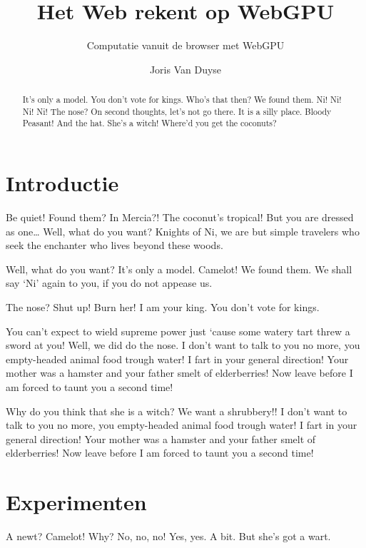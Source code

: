 \documentclass[a0,portrait]{hogent-poster}
\title{Het Web rekent op WebGPU}
\subtitle{Computatie vanuit de browser met WebGPU}
\author{Joris Van Duyse}
\begin{document}
\maketitle

\begin{abstract}
It's only a model.
You don't vote for kings. Who's that then? We found them. Ni! Ni! Ni! Ni!
The nose? On second thoughts, let's not go there. It is a silly place. Bloody Peasant! And the hat. She's a witch! Where'd you get the coconuts?
\end{abstract}

\begin{multicols}{2} %

\section{Introductie}

Be quiet! Found them? In Mercia?! The coconut's tropical! But you are dressed as one… Well, what do you want? Knights of Ni, we are but simple travelers who seek the enchanter who lives beyond these woods.

Well, what do you want? It's only a model. Camelot! We found them. We shall say `Ni' again to you, if you do not appease us.

The nose? Shut up! Burn her! I am your king. You don't vote for kings.

You can't expect to wield supreme power just `cause some watery tart threw a sword at you! Well, we did do the nose. I don't want to talk to you no more, you empty-headed animal food trough water! I fart in your general direction! Your mother was a hamster and your father smelt of elderberries! Now leave before I am forced to taunt you a second time!

Why do you think that she is a witch? We want a shrubbery!! I don't want to talk to you no more, you empty-headed animal food trough water! I fart in your general direction! Your mother was a hamster and your father smelt of elderberries! Now leave before I am forced to taunt you a second time!

\section{Experimenten}

A newt? Camelot! Why? No, no, no! Yes, yes. A bit. But she's got a wart.


\end{multicols}
\end{document}
